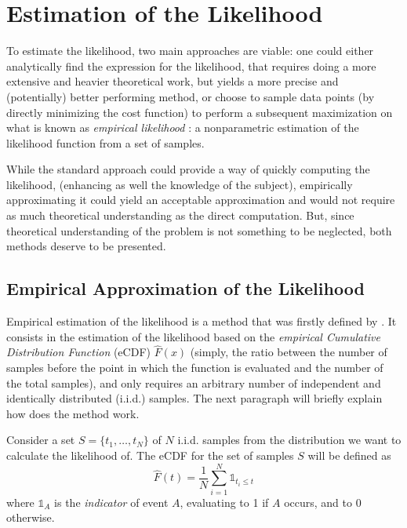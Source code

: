 \section{ Estimation of the Likelihood}
\label{sec:lik_est}
To estimate the likelihood, two main approaches are viable:
one could either analytically find the expression for the likelihood,
that requires doing a more extensive and heavier theoretical work,
but yields a more precise and (potentially) better performing method,
or choose to sample data points (by directly minimizing the cost function)
to perform a subsequent maximization on what is known as \textit{empirical likelihood} \parencite{10.1093/biomet/75.2.237}:
a nonparametric estimation of the likelihood function from a set of samples.

While the standard approach could provide a way of quickly computing the likelihood,
(enhancing as well the knowledge of the subject),
empirically approximating it could yield an acceptable approximation and would not require as much theoretical understanding as the direct computation.
But, since theoretical understanding of the problem is not something to be neglected,
both methods deserve to be presented.

\subsection{Empirical Approximation of the Likelihood}
\label{sec:emp_approx_lik}

Empirical estimation of the likelihood is a method that was firstly defined by \textcite{10.1093/biomet/75.2.237}.
It consists in the estimation of the likelihood based on the \textit{empirical Cumulative Distribution Function} (eCDF)  \(\hat{F}(x)\) (simply, the ratio between the number of samples before the point in which the function is evaluated and the number of the total samples),
and only requires an arbitrary number of independent and identically distributed (i.i.d.) samples.
The next paragraph will briefly explain how does the method work.

Consider a set \(S = \{t_1, \dots, t_N\}\) of \(N\) i.i.d. samples from the distribution we want to calculate the likelihood of.
The eCDF for the set of samples \(S\) will be defined as
\begin{equation}
  \label{eq:emp_cdf}
  \hat{F}(t) = \frac{1}{N}\sum_{i = 1}^N \mathbb{1}_{t_i \leq t}
\end{equation}
where \(\mathbb{1}_A\) is the \textit{indicator} of event \(A\),
evaluating to 1 if \(A\) occurs, and to 0 otherwise.

